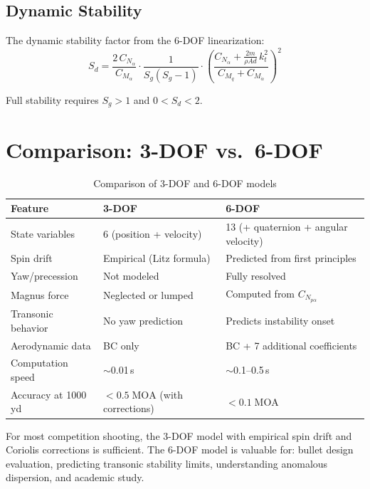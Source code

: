 \documentclass[11pt,twoside,openright]{report}
\begin{document}
\subsection{Dynamic Stability}

The dynamic stability factor from the 6-DOF linearization:
\begin{equation}
  S_d = \frac{2\,C_{N_\alpha}}{C_{M_\alpha}}\cdot\frac{1}{S_g(S_g-1)}\cdot\left(\frac{C_{N_\alpha} + \frac{2m}{\rho A d}\,k_t^2}{C_{M_q}+C_{M_{\dot{\alpha}}}}\right)^2
  \label{eq:sd_6dof}
\end{equation}

Full stability requires $S_g > 1$ and $0 < S_d < 2$.

\section{Comparison: 3-DOF vs.\ 6-DOF}

\begin{table}[H]
\centering
\caption{Comparison of 3-DOF and 6-DOF models}
\label{tab:3dof_vs_6dof}
\begin{tabularx}{\textwidth}{@{}lXX@{}}
\toprule
\textbf{Feature} & \textbf{3-DOF} & \textbf{6-DOF} \\
\midrule
State variables & 6 (position + velocity) & 13 (+ quaternion + angular velocity) \\
Spin drift & Empirical (Litz formula) & Predicted from first principles \\
Yaw/precession & Not modeled & Fully resolved \\
Magnus force & Neglected or lumped & Computed from $C_{N_{p\alpha}}$ \\
Transonic behavior & No yaw prediction & Predicts instability onset \\
Aerodynamic data & BC only & BC + 7 additional coefficients \\
Computation speed & $\sim$0.01\,s & $\sim$0.1--0.5\,s \\
Accuracy at 1000\,yd & $< 0.5\;\text{MOA}$ (with corrections) & $< 0.1\;\text{MOA}$ \\
\bottomrule
\end{tabularx}
\end{table}

For most competition shooting, the 3-DOF model with empirical spin drift and Coriolis corrections is sufficient. The 6-DOF model is valuable for: bullet design evaluation, predicting transonic stability limits, understanding anomalous dispersion, and academic study.
\end{document}

